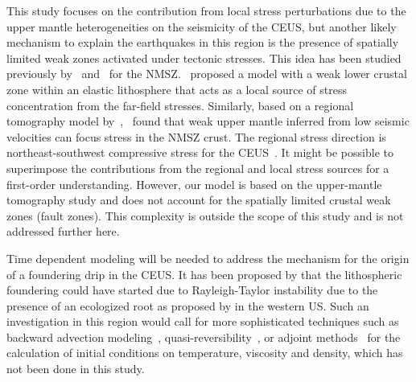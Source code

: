 \documentclass[draft,linenumbers]{agujournal2018}
\begin{document}
 This study focuses on the contribution from local stress perturbations due to the upper mantle heterogeneities on the seismicity of the CEUS, but another likely mechanism to explain the earthquakes in this region is the presence of spatially limited weak zones activated under tectonic stresses. This idea has been studied previously by~\citet{Kenner_2000a} and~\citet{zhan2016stress} for the NMSZ.~\citet{Kenner_2000a} proposed a model with a weak lower crustal zone within an elastic lithosphere that acts as a local source of stress concentration from the far-field stresses. Similarly, based on a regional tomography model by~\citet{pollitz2014seismic},~\citet{zhan2016stress} found that weak upper mantle inferred from low seismic velocities can focus stress in the NMSZ crust. The regional stress direction is northeast-southwest compressive stress for the CEUS~\citep{zoback1989tectonic}. It might be possible to superimpose the contributions from the regional and local stress sources for a first-order understanding. However, our model is based on the upper-mantle tomography study and does not account for the spatially limited crustal weak zones (fault zones). This complexity is outside the scope of this study and is not addressed further here.     
     
Time dependent modeling will be needed to address the mechanism for the origin of a foundering drip in the CEUS. It has been proposed by \cite{Biryol_2016} that the lithospheric foundering could have started due to Rayleigh-Taylor instability due to the presence of an ecologized root as proposed by \citet{le2006mantle} in the western US. Such an investigation in this region would call for more sophisticated techniques such as backward advection modeling~\citep[e.g.,][]{conrad2003seismic}, quasi-reversibility~\citep{glivsovic2016new}, or adjoint methods~\citep[e.g.,][]{bunge2003mantle, liu2008reconstructing} for the calculation of initial conditions on temperature, viscosity and density, which has not been done in this study.
\end{document}
